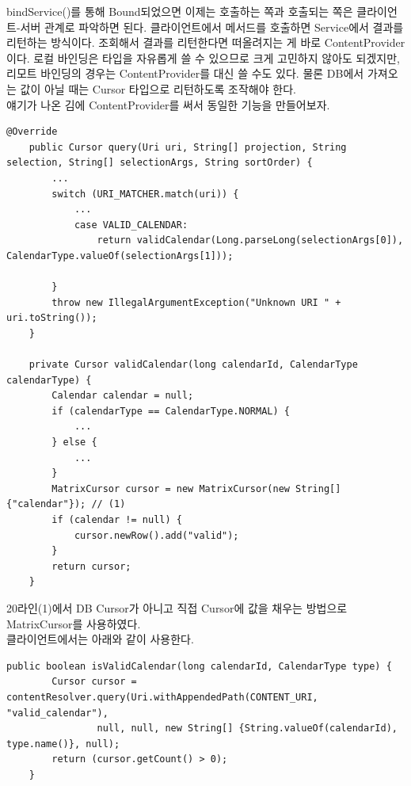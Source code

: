 bindService()를 통해 Bound되었으면 이제는 호출하는 쪽과 호출되는 쪽은 클라이언트-서버 관계로 파악하면 된다. 클라이언트에서 메서드를 호출하면 Service에서 결과를 리턴하는 방식이다. 
조회해서 결과를 리턴한다면 떠올려지는 게 바로 ContentProvider이다. 로컬 바인딩은 타입을 자유롭게 쓸 수 있으므로 크게 고민하지 않아도 되겠지만, 리모트 바인딩의 경우는 ContentProvider를 대신 쓸 수도 있다. 물론 DB에서 가져오는 값이 아닐 때는 Cursor 타입으로 리턴하도록 조작해야 한다.\\

얘기가 나온 김에 ContentProvider를 써서 동일한 기능을 만들어보자.
\begin{lstlisting}[frame=single]
	@Override
	public Cursor query(Uri uri, String[] projection, String selection, String[] selectionArgs, String sortOrder) {
		...
		switch (URI_MATCHER.match(uri)) {
			...
			case VALID_CALENDAR:
				return validCalendar(Long.parseLong(selectionArgs[0]),  CalendarType.valueOf(selectionArgs[1]));
				
		}
		throw new IllegalArgumentException("Unknown URI " + uri.toString());
	}

	private Cursor validCalendar(long calendarId, CalendarType calendarType) {
		Calendar calendar = null;
		if (calendarType == CalendarType.NORMAL) {
			...
		} else {
			...
		}
		MatrixCursor cursor = new MatrixCursor(new String[] {"calendar"}); // (1)
		if (calendar != null) {
			cursor.newRow().add("valid");
		}
		return cursor;
	}
\end{lstlisting}
20라인(1)에서 DB Cursor가 아니고 직접 Cursor에 값을 채우는 방법으로 MatrixCursor를 사용하였다.\\

클라이언트에서는 아래와 같이 사용한다.
\begin{lstlisting}[frame=single]
	public boolean isValidCalendar(long calendarId, CalendarType type) {
		Cursor cursor = contentResolver.query(Uri.withAppendedPath(CONTENT_URI, "valid_calendar"), 
				null, null, new String[] {String.valueOf(calendarId), type.name()}, null);
		return (cursor.getCount() > 0);
	}
\end{lstlisting}

